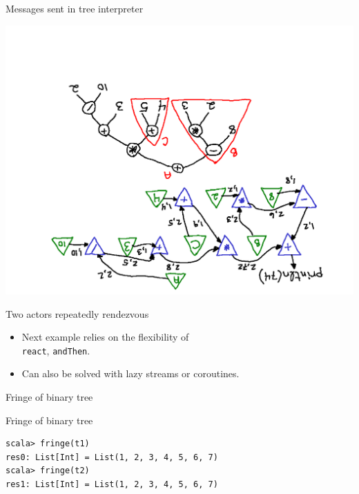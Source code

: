 \documentclass[14pt,t,usepdftitle=false,
xcolornames=x11names,svgnames,dvipsnames]{beamer}
\begin{document}
\begin{frame}[fragile]{Messages sent in tree interpreter}
  \vspace{-12mm}
  \begin{center}
    \includegraphics[scale=.4,angle=180]{interp-partition-mesg.pdf}
  \end{center}
\end{frame}

\begin{frame}{Two actors repeatedly rendezvous}
  \begin{itemize}
  \item Next example relies on the flexibility of\\\lstinline:react:,
    \lstinline:andThen:.
  \item Can also be solved with lazy streams or coroutines.
  \end{itemize}
\end{frame}

\begin{frame}[fragile]{Fringe of binary tree}
  
\end{frame}

\begin{frame}[fragile]{Fringe of binary tree}
  
  \begin{lstlisting}[style=scalarepl]
scala> fringe(t1)
res0: List[Int] = List(1, 2, 3, 4, 5, 6, 7)
scala> fringe(t2)
res1: List[Int] = List(1, 2, 3, 4, 5, 6, 7)
  \end{lstlisting}
\end{frame}
\end{document}
